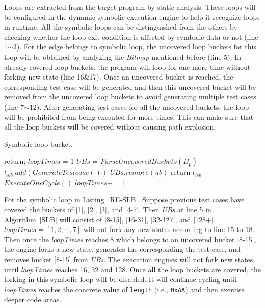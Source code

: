 Loops are extracted from the target program by static analysis. 
These loops will be configured in the dynamic symbolic execution 
engine to help it recognize loops in runtime. All the symbolic loops 
can be distinguished from the others by checking whether the loop 
exit condition is affected by symbolic data or not (line 1$\sim$3). 
For the edge belongs to symbolic loop, the uncovered loop buckets 
for this loop will be obtained by analyzing the \textit{Bitmap} 
mentioned before (line 5). 
In already covered loop buckets, the program will loop for one more 
time without forking new state (line 16\&17). Once an uncovered bucket 
is reached, the corresponding test case will be generated and then 
this uncovered bucket will be removed from the uncovered loop buckets 
to avoid generating multiple test cases (line 7$\sim$12). After 
generating test cases for all the uncovered buckets, the loop will 
be prohibited from being executed for more times. This can make sure 
that all the loop buckets will be covered without causing path explosion.

\begin{algorithm}
  \LinesNumbered
  \caption{Symbolic loop bucket.}
  \label{SLB}
  {
    return;
  }
  $loopTimes$ = 1\;
  $UBs$ = $ParseUncoveredBuckets(B_p)$\;
  {
    {
      {
        $t_{slb}.add(GenerateTestcase())$\;
        $UBs$.$remove(ub)$\;
      }
    }
    {
      return $t_{lsb}$\;
    }{
      $ExecuteOneCycle()$\;
      $loopTimes += 1$\;
    }
  }
\end{algorithm}  

For the symbolic loop in Listing~\ref{RE-SLB}. Suppose previous 
test cases have covered the buckets of [1], [2], [3], and [4-7]. 
Then \textit{UBs} at line 5 in Algorithm~\ref{SLB} will consist of 
[8-15], [16-31], [32-127], and [128+]. 
$\textit{loopTimes}=[1, 2, \cdots, 7]$ will not fork any new states 
according to line 15 to 18. Then once the \textit{loopTimes} reaches 
8 which belongs to an uncovered bucket [8-15], the engine forks a 
new state,  generates the corresponding the test case, and removes 
bucket [8-15] from \textit{UBs}. The execution engines will not 
fork new states until \textit{loopTimes} reaches 16, 32 and 128. 
Once all the loop buckets are covered, the forking in this 
symbolic loop will be disabled. It will continue cycling until 
\textit{loopTimes} reaches the concrete value of \texttt{length} 
(i.e., \texttt{0xAA}) and then exercise deeper code areas.
